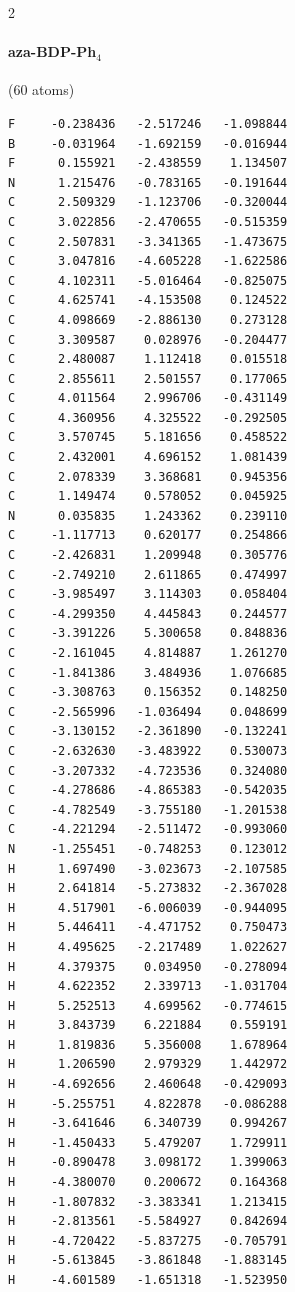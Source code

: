 \begin{multicols}{2}
\paragraph{aza-BDP-Ph$_4$} (60 atoms)
{\scriptsize\linespread{1}\selectfont\begin{verbatim}
F     -0.238436   -2.517246   -1.098844
B     -0.031964   -1.692159   -0.016944
F      0.155921   -2.438559    1.134507
N      1.215476   -0.783165   -0.191644
C      2.509329   -1.123706   -0.320044
C      3.022856   -2.470655   -0.515359
C      2.507831   -3.341365   -1.473675
C      3.047816   -4.605228   -1.622586
C      4.102311   -5.016464   -0.825075
C      4.625741   -4.153508    0.124522
C      4.098669   -2.886130    0.273128
C      3.309587    0.028976   -0.204477
C      2.480087    1.112418    0.015518
C      2.855611    2.501557    0.177065
C      4.011564    2.996706   -0.431149
C      4.360956    4.325522   -0.292505
C      3.570745    5.181656    0.458522
C      2.432001    4.696152    1.081439
C      2.078339    3.368681    0.945356
C      1.149474    0.578052    0.045925
N      0.035835    1.243362    0.239110
C     -1.117713    0.620177    0.254866
C     -2.426831    1.209948    0.305776
C     -2.749210    2.611865    0.474997
C     -3.985497    3.114303    0.058404
C     -4.299350    4.445843    0.244577
C     -3.391226    5.300658    0.848836
C     -2.161045    4.814887    1.261270
C     -1.841386    3.484936    1.076685
C     -3.308763    0.156352    0.148250
C     -2.565996   -1.036494    0.048699
C     -3.130152   -2.361890   -0.132241
C     -2.632630   -3.483922    0.530073
C     -3.207332   -4.723536    0.324080
C     -4.278686   -4.865383   -0.542035
C     -4.782549   -3.755180   -1.201538
C     -4.221294   -2.511472   -0.993060
N     -1.255451   -0.748253    0.123012
H      1.697490   -3.023673   -2.107585
H      2.641814   -5.273832   -2.367028
H      4.517901   -6.006039   -0.944095
H      5.446411   -4.471752    0.750473
H      4.495625   -2.217489    1.022627
H      4.379375    0.034950   -0.278094
H      4.622352    2.339713   -1.031704
H      5.252513    4.699562   -0.774615
H      3.843739    6.221884    0.559191
H      1.819836    5.356008    1.678964
H      1.206590    2.979329    1.442972
H     -4.692656    2.460648   -0.429093
H     -5.255751    4.822878   -0.086288
H     -3.641646    6.340739    0.994267
H     -1.450433    5.479207    1.729911
H     -0.890478    3.098172    1.399063
H     -4.380070    0.200672    0.164368
H     -1.807832   -3.383341    1.213415
H     -2.813561   -5.584927    0.842694
H     -4.720422   -5.837275   -0.705791
H     -5.613845   -3.861848   -1.883145
H     -4.601589   -1.651318   -1.523950
\end{verbatim}}

\end{multicols}
